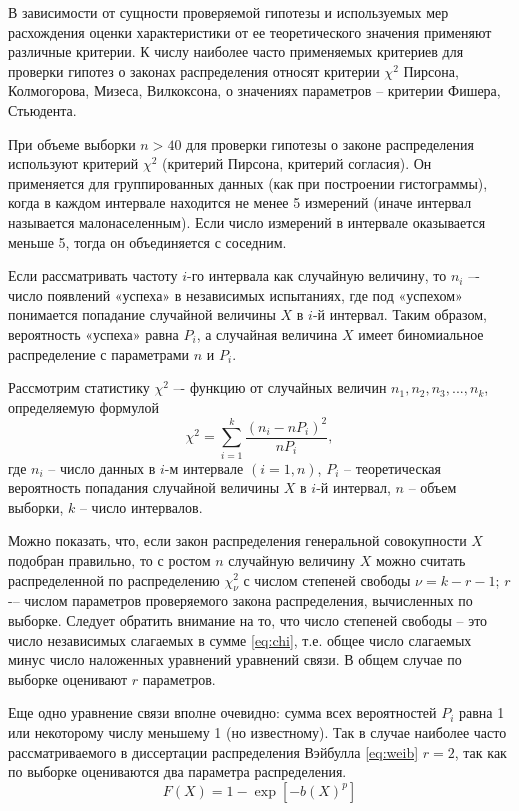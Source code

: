 В зависимости от сущности проверяемой гипотезы и используемых мер расхождения оценки характеристики от ее теоретического значения применяют различные критерии. К числу наиболее часто применяемых критериев для проверки гипотез о законах распределения относят критерии $\chi^2$ Пирсона, Колмогорова, Мизеса, Вилкоксона, о значениях параметров – критерии Фишера, Стьюдента.

При объеме выборки $n>40$ для проверки гипотезы о законе распределения используют критерий $\chi^2$ (критерий Пирсона, критерий согласия). Он применяется для группированных данных (как при построении гистограммы), когда в каждом интервале находится не менее 5 измерений (иначе интервал называется малонаселенным). Если число измерений в интервале оказывается меньше 5, тогда он объединяется с соседним.


Если рассматривать частоту $i$-го интервала как случайную величину, то  $n_i$ –- число появлений «успеха» в  независимых испытаниях, где под «успехом» понимается попадание случайной величины $X$ в $i$-й интервал. Таким образом, вероятность «успеха» равна $P_i$, а случайная величина $X$ имеет биномиальное распределение с параметрами $n$ и $P_i$.

Рассмотрим статистику $\chi^2$ –- функцию от случайных величин $n_1, n_2,n_3,...,n_k$, определяемую формулой
\begin{equation}\label{eq:chi}
  \chi^2=\sum\limits_{i=1}^k\frac{(n_i-nP_i)^2}{nP_i},
\end{equation}
где $n_i$ -- число данных в $i$-м интервале $(i=1,n)$, $P_i$ -- теоретическая вероятность попадания случайной величины $X$ в $i$-й интервал, $n$ -- объем выборки, $k$ -- число интервалов.

Можно показать, что, если закон распределения генеральной совокупности $X$ подобран правильно, то с ростом $n$ случайную величину $X$ можно считать распределенной по распределению $\chi_{\nu}^2$ с числом степеней свободы $\nu=k-r-1$; $r$ -– числом параметров проверяемого закона распределения, вычисленных по выборке. Следует обратить внимание на то, что число степеней свободы -- это число независимых слагаемых в сумме \eqref{eq:chi}, т.е. общее число слагаемых минус число наложенных уравнений уравнений связи. В общем случае по выборке оценивают $r$ параметров.

Еще одно уравнение связи вполне очевидно: сумма всех вероятностей $P_i$ равна 1 или некоторому числу меньшему 1 (но известному). Так в случае наиболее часто рассматриваемого в диссертации распределения Вэйбулла \eqref{eq:weib} $r=2$, так как по выборке оцениваются два параметра распределения.
\begin{equation} \label{eq:weib}
F(X)=1-\exp \left[-b\left(X \right)^{p} \right]
\end{equation}

